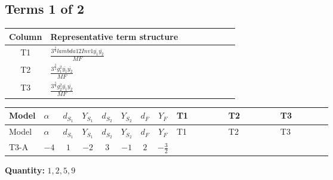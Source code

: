 \documentclass[8pt]{article}
\begin{document}
\begin{landscape}
\subsection*{Terms 1 of 2}
\begin{center}
\begin{tabular}{@{}c >{\raggedright\arraybackslash}p{0.82\linewidth}@{}}
\toprule
Column & Representative term structure \\
\midrule
T1 & \(\displaystyle \frac{3^{\frac{3}{4}} lambda12Inv1 \overline{y_{1}} \overline{y_{2}}}{MF}\) \\
\midrule
T2 & \(\displaystyle \frac{3^{\frac{3}{4}} g_{1}^{2} \overline{y_{1}} \overline{y_{2}}}{MF}\) \\
\midrule
T3 & \(\displaystyle \frac{3^{\frac{3}{4}} g_{2}^{2} \overline{y_{1}} \overline{y_{2}}}{MF}\) \\
\midrule
\bottomrule
\end{tabular}
\end{center}
\smallskip
\tiny
\begin{longtable}{@{}llcccccc >{\raggedright\arraybackslash}p{0.21\linewidth} >{\raggedright\arraybackslash}p{0.21\linewidth} >{\raggedright\arraybackslash}p{0.21\linewidth}@{}}
\toprule
Model & $\alpha$ & $d_{S_1}$ & $Y_{S_1}$ & $d_{S_2}$ & $Y_{S_2}$ & $d_F$ & $Y_F$ & T1 & T2 & T3 \\
\midrule
\endfirsthead
\toprule
Model & $\alpha$ & $d_{S_1}$ & $Y_{S_1}$ & $d_{S_2}$ & $Y_{S_2}$ & $d_F$ & $Y_F$ & T1 & T2 & T3 \\
\midrule
\endhead
T3-A & $-4$ & $1$ & $-2$ & $3$ & $-1$ & $2$ & $-\frac{3}{2}$ & \scriptsize\adjustbox{max width=\linewidth}{$\begin{gathered} \frac{3^{\frac{3}{4}} lambda12Inv1 \overline{y_{1}} \overline{y_{2}}}{6 MF}\end{gathered}$} & \scriptsize\adjustbox{max width=\linewidth}{$\begin{gathered} \frac{9 \cdot 3^{\frac{3}{4}} g_{1}^{2} \overline{y_{1}} \overline{y_{2}}}{8 MF}\end{gathered}$} & \scriptsize\adjustbox{max width=\linewidth}{$\begin{gathered} \frac{25 \cdot 3^{\frac{3}{4}} g_{2}^{2} \overline{y_{1}} \overline{y_{2}}}{24 MF}\end{gathered}$} \\
\midrule
\bottomrule
\end{longtable}
\clearpage
\noindent\textbf{Quantity: }$\mathrm{1,2,5,9}$\par\smallskip

\end{landscape}
\end{document}
